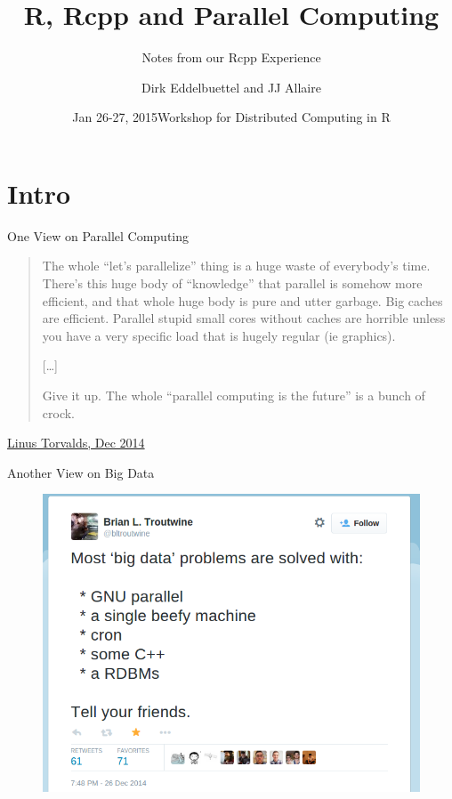 \documentclass[12pt,ignorenonframetext,compress]{beamer}
\title{R, Rcpp and Parallel Computing}
\subtitle{Notes from our Rcpp Experience}
\author{Dirk Eddelbuettel and JJ Allaire}
\date{Jan 26-27, 2015\newline Workshop for Distributed Computing in R}
\begin{document}
\frame{\titlepage}

\section{Intro}\label{intro}

\begin{frame}{One View on Parallel Computing}

\begin{quote}
The whole ``let's parallelize'' thing is a huge waste of everybody's
time. There's this huge body of ``knowledge'' that parallel is somehow
more efficient, and that whole huge body is pure and utter garbage. Big
caches are efficient. Parallel stupid small cores without caches are
horrible unless you have a very specific load that is hugely regular (ie
graphics).

{[}\ldots{}{]}

Give it up. The whole ``parallel computing is the future'' is a bunch of
crock.
\end{quote}

\href{http://www.realworldtech.com/forum/?threadid=146066\&curpostid=146227}{Linus
Torvalds, Dec 2014}

\end{frame}

\begin{frame}{Another View on Big Data}

\begin{figure}
\begin{center}
\includegraphics[width=\textwidth,height=0.8\textheight,keepaspectratio]{images/big-data-big-machine-tweet.png}
\end{center}
\end{figure}

\end{frame}
\end{document}
